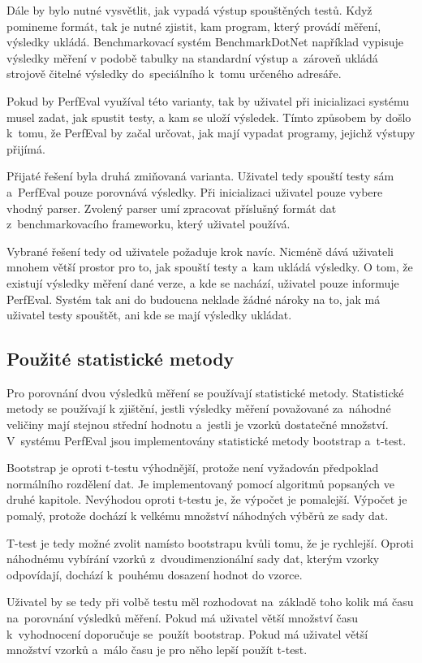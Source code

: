 Dále by bylo nutné vysvětlit, jak vypadá výstup spouštěných testů. Když pomineme formát, tak je nutné zjistit,
kam program, který provádí měření, výsledky ukládá. Benchmarkovací systém BenchmarkDotNet například vypisuje
výsledky měření v podobě tabulky na standardní výstup a~zároveň ukládá strojově čitelné výsledky do~speciálního
k~tomu určeného adresáře.

Pokud by PerfEval využíval této varianty, tak by uživatel při inicializaci systému musel zadat, jak spustit testy,
a kam se uloží výsledek. Tímto způsobem by došlo k~tomu, že PerfEval by začal určovat, jak mají vypadat programy,
jejichž výstupy přijímá.

Přijaté řešení byla druhá zmiňovaná varianta. Uživatel tedy spouští testy sám a~PerfEval pouze porovnává výsledky.
Při inicializaci uživatel pouze vybere vhodný parser. Zvolený parser umí zpracovat příslušný formát dat z~benchmarkovacího frameworku,
který uživatel používá.

Vybrané řešení tedy od uživatele požaduje krok navíc. Nicméně dává uživateli mnohem větší prostor pro to, jak
spouští testy a~kam ukládá výsledky. O tom, že existují výsledky měření dané verze, a kde se nachází, uživatel
pouze informuje PerfEval. Systém tak ani do budoucna neklade žádné nároky na to, jak má uživatel testy spouštět,
ani kde se mají výsledky ukládat.

\subsection{Použité statistické metody}
Pro porovnání dvou výsledků měření se používají statistické metody. Statistické metody se používají k zjištění,
jestli výsledky měření považované za~náhodné veličiny mají stejnou střední hodnotu a~jestli je vzorků dostatečné množství.
V~systému PerfEval jsou implementovány statistické metody bootstrap a~t-test.

Bootstrap je oproti t-testu výhodnější, protože není vyžadován předpoklad normálního rozdělení dat.
Je implementovaný pomocí algoritmů popsaných ve druhé kapitole. Nevýhodou oproti t-testu je, že
výpočet je pomalejší. Výpočet je pomalý, protože dochází k velkému množství náhodných výběrů ze sady dat.

T-test je tedy možné zvolit namísto bootstrapu kvůli tomu, že je rychlejší. Oproti náhodnému vybírání vzorků z~dvoudimenzionální sady
dat, kterým vzorky odpovídají, dochází k~pouhému dosazení hodnot do vzorce.

Uživatel by se tedy při volbě testu měl rozhodovat na~základě toho kolik má času na~porovnání
výsledků měření. Pokud má uživatel větší množství času k~vyhodnocení doporučuje se~použít bootstrap.
Pokud má uživatel větší množství vzorků a~málo času je pro něho lepší použít t-test.

